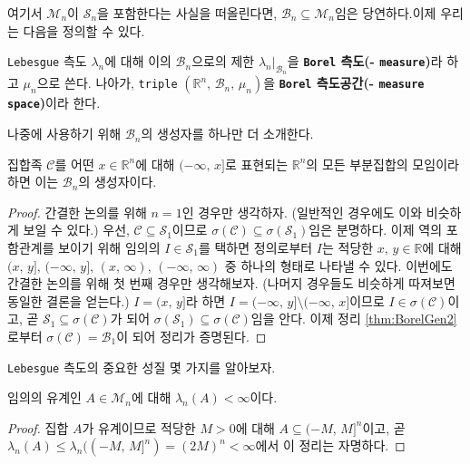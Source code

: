 여기서 $\mathcal{M}_n$이 $\mathcal{S}_n$을 포함한다는 사실을 떠올린다면, $\mathcal{B}_n\subseteq\mathcal{M}_n$임은 당연하다.\footnotemark 이제 우리는 다음을 정의할 수 있다.

\begin{definition}
    \texttt{Lebesgue} 측도 $\lambda_n$에 대해 이의 $\mathcal{B}_n$으로의 제한 $\lambda_n\vert_{\mathcal{B}_n}$을 \textbf{\texttt{Borel} 측도(- \texttt{measure})}라 하고 $\mu_n$으로 쓴다. 나아가, \texttt{triple} $(\mathbb{R}^n,\,\mathcal{B}_n,\,\mu_n)$을 \textbf{\texttt{Borel} 측도공간(- \texttt{measure space})}이라 한다.
\end{definition}

나중에 사용하기 위해 $\mathcal{B}_n$의 생성자를 하나만 더 소개한다.

\begin{theorem}\label{thm:BorelGen3}
    집합족 $\mathcal{C}$를 어떤 $x\in\mathbb{R}^n$에 대해 $(-\infty,\,x]$로 표현되는 $\mathbb{R}^n$의 모든 부분집합의 모임이라 하면 이는 $\mathcal{B}_n$의 생성자이다.
\end{theorem}

\begin{proof}
    간결한 논의를 위해 $n=1$인 경우만 생각하자. (일반적인 경우에도 이와 비슷하게 보일 수 있다.) 우선, $\mathcal{C}\subseteq\mathcal{S}_1$이므로 $\sigma(\mathcal{C})\subseteq\sigma(\mathcal{S}_1)$임은 분명하다. 이제 역의 포함관계를 보이기 위해 임의의 $I\in\mathcal{S}_1$를 택하면 정의로부터 $I$는 적당한 $x,\,y\in\mathbb{R}$에 대해 $(x,\,y],\,(-\infty,\,y],\,(x,\,\infty),\,(-\infty,\,\infty)$ 중 하나의 형태로 나타낼 수 있다. 이번에도 간결한 논의를 위해 첫 번째 경우만 생각해보자.  (나머지 경우들도 비슷하게 따져보면 동일한 결론을 얻는다.) $I=(x,\,y]$라 하면 $I=(-\infty,\,y]\setminus(-\infty,\,x]$이므로 $I\in\sigma(\mathcal{C})$이고, 곧 $\mathcal{S}_1\subseteq\sigma(\mathcal{C})$가 되어 $\sigma(\mathcal{S}_1)\subseteq\sigma(\mathcal{C})$임을 안다. 이제 정리 \ref{thm:BorelGen2}로부터 $\sigma(\mathcal{C})=\mathcal{B}_1$이 되어 정리가 증명된다.
\end{proof}

\texttt{Lebesgue} 측도의 중요한 성질 몇 가지를 알아보자.

\begin{theorem}\label{thm:boundedMeasure}
    임의의 유계인 $A\in\mathcal{M}_n$에 대해 $\lambda_n(A)<\infty$이다.
\end{theorem}

\begin{proof}
    집합 $A$가 유계이므로 적당한 $M>0$에 대해 $A\subseteq(-M,\,M]^n$이고, 곧 $\lambda_n(A)\leq\lambda_n((-M,\,M]^n)=(2M)^n<\infty$에서 이 정리는 자명하다.
\end{proof}

